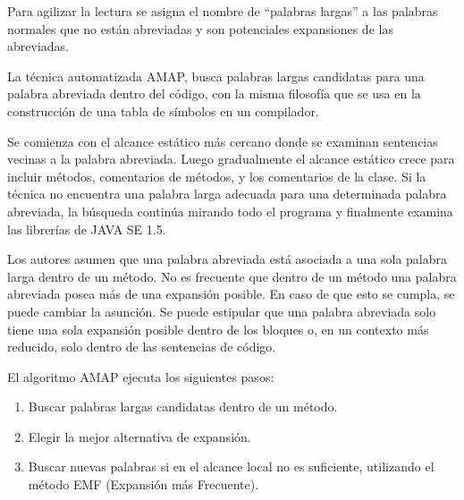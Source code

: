 Para agilizar la lectura se asigna el nombre de “palabras largas” a las palabras normales que no están abreviadas y son potenciales expansiones de las abreviadas.

La técnica automatizada AMAP, busca palabras largas candidatas para una palabra abreviada dentro del código, con la misma filosofía que se usa en la construcción de una tabla de símbolos en un compilador.

Se comienza con el alcance estático más cercano donde se examinan sentencias vecinas a la palabra abreviada. Luego gradualmente el alcance estático crece para incluir métodos, comentarios de métodos, y los comentarios de la clase. Si la técnica no encuentra una palabra larga adecuada para una determinada palabra abreviada, la búsqueda continúa mirando todo el programa y finalmente examina las librerías de JAVA SE 1.5. 

Los autores asumen que una palabra abreviada está asociada a una sola palabra larga dentro de un método. No es frecuente que dentro de un método una palabra abreviada posea más de una expansión posible. En caso de que esto se cumpla, se puede cambiar la asunción. Se puede estipular que una palabra abreviada solo tiene una sola expansión posible dentro de los bloques o, en un contexto más reducido, solo dentro de las sentencias de código.


El algoritmo AMAP ejecuta los siguientes pasos:

\begin{enumerate}
\itemsep0em%
\item Buscar palabras largas candidatas dentro de un método.
\item Elegir la mejor alternativa de expansión.
\item Buscar nuevas palabras si en el alcance local no es suficiente, utilizando el método EMF (Expansión más Frecuente).
\end{enumerate}

